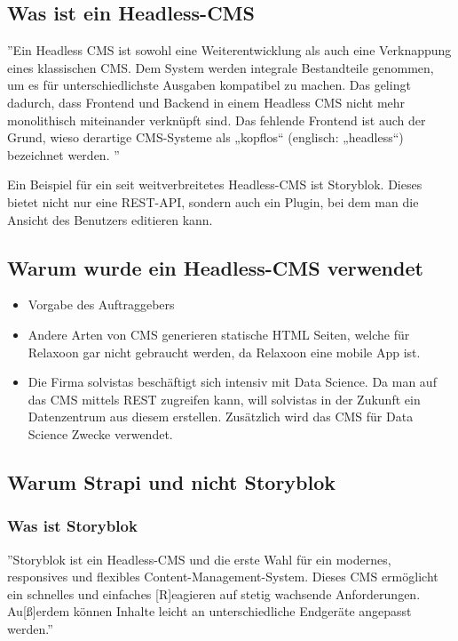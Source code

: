 \subsection{Was ist ein Headless-CMS}
''Ein Headless CMS ist sowohl eine Weiterentwicklung als
auch eine Verknappung eines klassischen CMS. Dem System
werden integrale Bestandteile genommen, um es für
unterschiedlichste Ausgaben kompatibel zu machen.
Das gelingt dadurch, dass Frontend und Backend in einem
Headless CMS nicht mehr monolithisch miteinander verknüpft
sind. Das fehlende Frontend ist auch der Grund,
wieso derartige CMS-Systeme als
„kopflos“ (englisch: „headless“) bezeichnet werden.
'' \cite{headles-cms}

Ein Beispiel für ein seit weitverbreitetes Headless-CMS ist Storyblok. Dieses bietet nicht nur eine REST-API, sondern
auch ein Plugin, bei dem man die Ansicht des Benutzers editieren kann. \cite[]{storyblok-bad}

\subsection{Warum wurde ein Headless-CMS verwendet}
\begin{itemize}
    \item Vorgabe des Auftraggebers
    \item Andere Arten von CMS generieren statische HTML Seiten, welche für Relaxoon gar nicht gebraucht werden,
          da Relaxoon eine mobile App ist.
    \item Die Firma solvistas beschäftigt sich intensiv mit Data Science. Da man auf das CMS mittels REST zugreifen kann,
          will solvistas in der Zukunft ein Datenzentrum aus diesem erstellen.
          Zusätzlich wird das CMS für Data Science Zwecke verwendet.
\end{itemize}

\subsection{Warum Strapi und nicht Storyblok}
\subsubsection{Was ist Storyblok}
''Storyblok ist ein Headless-CMS und die erste Wahl für ein modernes,
responsives und flexibles Content-Management-System.
Dieses CMS ermöglicht ein schnelles und einfaches [R]eagieren auf stetig wachsende Anforderungen.
Au[ß]erdem können Inhalte leicht an unterschiedliche Endgeräte angepasst werden.''
\cite{storyblok}

